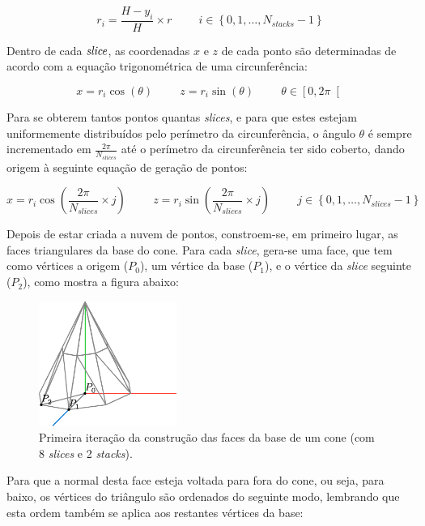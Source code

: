 \documentclass[12pt, a4paper]{article}
\begin{document}
$$
r_i = \frac{H - y_i}{H}\times r
\hspace{1cm}
i \in \left \lbrace 0, 1, \ldots, N_{stacks} - 1 \right \rbrace
$$

Dentro de cada $\emph{slice}$, as coordenadas $x$ e $z$ de cada ponto são determinadas de acordo
com a equação trigonométrica de uma circunferência:

$$
x = r_i \cos(\theta)
\hspace{1cm}
z = r_i \sin(\theta)
\hspace{1cm}
\theta \in \left [ 0, 2 \pi \right [
$$

Para se obterem tantos pontos quantas \emph{slices}, e para que estes estejam uniformemente
distribuídos pelo perímetro da circunferência, o ângulo $\theta$ é sempre incrementado em
$\frac{2 \pi}{N_{slices}}$ até o perímetro da circunferência ter sido coberto, dando origem à
seguinte equação de geração de pontos:

$$
x = r_i \cos \left ( \frac{2 \pi}{N_{slices}} \times j \right )
\hspace{1cm}
z = r_i \sin \left ( \frac{2 \pi}{N_{slices}} \times j \right )
\hspace{1cm}
j \in \left \lbrace 0, 1, \ldots, N_{slices} - 1 \right \rbrace
$$

Depois de estar criada a nuvem de pontos, constroem-se, em primeiro lugar, as faces triangulares da
base do cone. Para cada \emph{slice}, gera-se uma face, que tem  como vértices a origem ($P_0$), um
vértice da base ($P_1$), e o vértice da \emph{slice} seguinte ($P_2$), como mostra a figura abaixo:

\begin{figure}[H]
    \centering
    \includegraphics[width=0.4\textwidth]{res/figures/Cone3.pdf}
    \caption{
        \onehalfspacing
        Primeira iteração da construção das faces da base de um cone (com 8 \emph{slices} e 2
        \emph{stacks}).
    }
\end{figure}

Para que a normal desta face esteja voltada para fora do cone, ou seja, para baixo, os vértices do
triângulo são ordenados do seguinte modo, lembrando que esta ordem também se aplica aos restantes
vértices da base:
\end{document}
